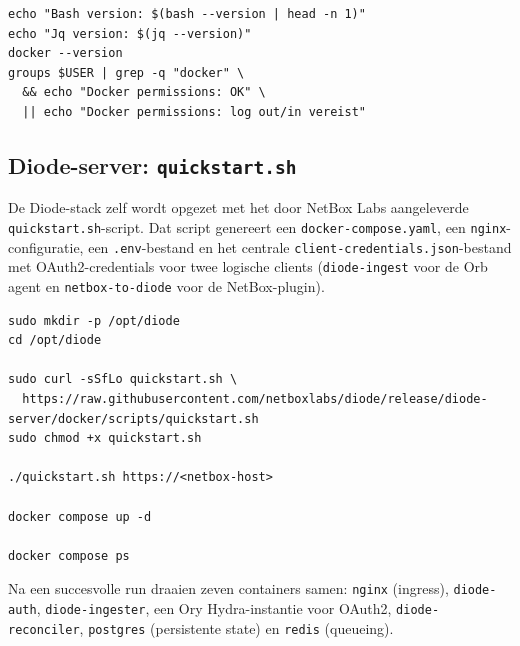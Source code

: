 \begin{listing}[H]
  \caption[Verificatie van de hostprerequisites]{Verificatie van de hostprerequisites vóór de Diode-installatie}
  \label{lst:diode-prereq-verify}
  \begin{verbatim}
echo "Bash version: $(bash --version | head -n 1)"
echo "Jq version: $(jq --version)"
docker --version
groups $USER | grep -q "docker" \
  && echo "Docker permissions: OK" \
  || echo "Docker permissions: log out/in vereist"
  \end{verbatim}
\end{listing}

\subsection{Diode-server: \texttt{quickstart.sh}}

De Diode-stack zelf wordt opgezet met het door NetBox Labs aangeleverde \texttt{quickstart.sh}-script. Dat script genereert een \texttt{docker-compose.yaml}, een \texttt{nginx}-configuratie, een \texttt{.env}-bestand en het centrale \texttt{client-credentials.json}-bestand met OAuth2-credentials voor twee logische clients (\texttt{diode-ingest} voor de Orb agent en \texttt{netbox-to-diode} voor de NetBox-plugin).

\begin{listing}[H]
  \caption[Uitrol van de Diode-server via \texttt{quickstart.sh}]{Uitrol van de Diode-server via het door NetBox Labs aangeleverde \texttt{quickstart.sh}-script (\S\ref{sec:uitrol-diode})}
  \label{lst:diode-quickstart}
  \begin{verbatim}
sudo mkdir -p /opt/diode
cd /opt/diode

sudo curl -sSfLo quickstart.sh \
  https://raw.githubusercontent.com/netboxlabs/diode/release/diode-server/docker/scripts/quickstart.sh
sudo chmod +x quickstart.sh

./quickstart.sh https://<netbox-host>

docker compose up -d

docker compose ps
  \end{verbatim}
\end{listing}

Na een succesvolle run draaien zeven containers samen: \texttt{nginx} (ingress), \texttt{diode-auth}, \texttt{diode-ingester}, een Ory Hydra-instantie voor OAuth2, \texttt{diode-reconciler}, \texttt{postgres} (persistente state) en \texttt{redis} (queueing).

